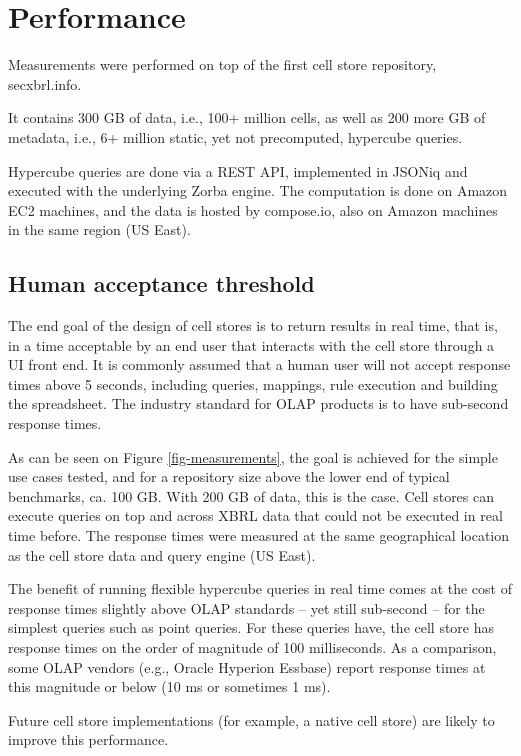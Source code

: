 \documentclass{acm_proc_article-sp}
\begin{document}
\section{Performance}
\label{section-performance}
Measurements were performed on top of the first cell store repository, secxbrl.info.

It contains 300 GB of data, i.e., 100+ million cells, as well as 200 more GB of metadata, i.e., 6+ million static, yet not precomputed, hypercube queries.

Hypercube queries are done via a REST API, implemented in JSONiq and executed with the underlying Zorba engine. The computation is done on Amazon EC2 machines, and the data is hosted by compose.io, also on Amazon machines in the same region (US East).

\subsection{Human acceptance threshold}

The end goal of the design of cell stores is to return results in real time, that is, in a time acceptable by an end user that interacts with the cell store through a UI front end. It is commonly assumed that a human user will not accept response times above 5 seconds, including queries, mappings, rule execution and building the spreadsheet. The industry standard for OLAP products is to have sub-second response times.

As can be seen on Figure \ref{fig-measurements}, the goal is achieved for the simple use cases tested, and for a repository size above the lower end of typical benchmarks, ca. 100 GB. With 200 GB of data, this is the case. Cell stores can execute queries on top and across XBRL data that could not be executed in real time before. The response times were measured at the same geographical location as the cell store data and query engine (US East). 

The benefit of running flexible hypercube queries in real time comes at the cost of response times slightly above OLAP standards  -- yet still sub-second -- for the simplest queries such as point queries. For these queries have, the cell store has response times on the order of magnitude of 100 milliseconds. As a comparison, some OLAP vendors (e.g., Oracle Hyperion Essbase) report response times at this magnitude or below (10 ms or sometimes 1 ms).

Future cell store implementations (for example, a native cell store) are likely to improve this performance.
\end{document}

